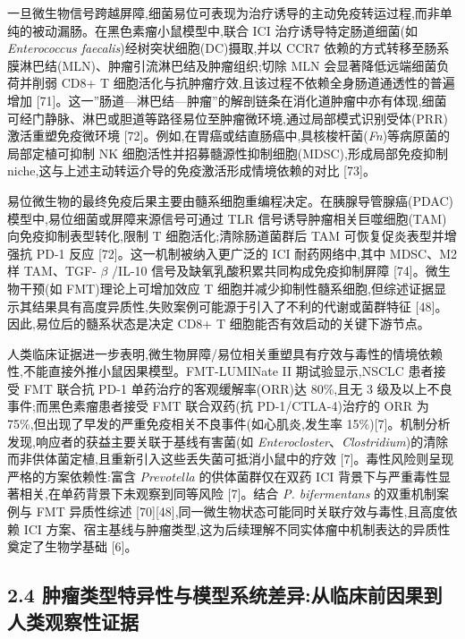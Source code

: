 \documentclass[11pt]{article}
\begin{document}
一旦微生物信号跨越屏障,细菌易位可表现为治疗诱导的主动免疫转运过程,而非单纯的被动漏肠。在黑色素瘤小鼠模型中,联合 ICI 治疗诱导特定肠道细菌(如 \emph{Enterococcus faecalis})经树突状细胞(DC)摄取,并以 CCR7 依赖的方式转移至肠系膜淋巴结(MLN)、肿瘤引流淋巴结及肿瘤组织;切除 MLN 会显著降低远端细菌负荷并削弱 CD8+ T 细胞活化与抗肿瘤疗效,且该过程不依赖全身肠道通透性的普遍增加 {[}71{]}。这一''肠道---淋巴结---肿瘤''的解剖链条在消化道肿瘤中亦有体现,细菌可经门静脉、淋巴或胆道等路径易位至肿瘤微环境,通过局部模式识别受体(PRR)激活重塑免疫微环境 {[}72{]}。例如,在胃癌或结直肠癌中,具核梭杆菌(\emph{Fn})等病原菌的局部定植可抑制 NK 细胞活性并招募髓源性抑制细胞(MDSC),形成局部免疫抑制 niche,这与上述主动转运介导的免疫激活形成情境依赖的对比 {[}73{]}。

易位微生物的最终免疫后果主要由髓系细胞重编程决定。在胰腺导管腺癌(PDAC)模型中,易位细菌或屏障来源信号可通过 TLR 信号诱导肿瘤相关巨噬细胞(TAM)向免疫抑制表型转化,限制 T 细胞活化;清除肠道菌群后 TAM 可恢复促炎表型并增强抗 PD-1 反应 {[}72{]}。这一机制被纳入更广泛的 ICI 耐药网络中,其中 MDSC、M2 样 TAM、TGF- \(\beta\) /IL-10 信号及缺氧乳酸积累共同构成免疫抑制屏障 {[}74{]}。微生物干预(如 FMT)理论上可增加效应 T 细胞并减少抑制性髓系细胞,但综述证据显示其结果具有高度异质性,失败案例可能源于引入了不利的代谢或菌群特征 {[}48{]}。因此,易位后的髓系状态是决定 CD8+ T 细胞能否有效启动的关键下游节点。

人类临床证据进一步表明,微生物屏障/易位相关重塑具有疗效与毒性的情境依赖性,不能直接外推小鼠因果模型。FMT-LUMINate II 期试验显示,NSCLC 患者接受 FMT 联合抗 PD-1 单药治疗的客观缓解率(ORR)达 80\%,且无 3 级及以上不良事件;而黑色素瘤患者接受 FMT 联合双药(抗 PD-1/CTLA-4)治疗的 ORR 为 75\%,但出现了早发的严重免疫相关不良事件(如心肌炎,发生率 15\%){[}7{]}。机制分析发现,响应者的获益主要关联于基线有害菌(如 \emph{Enterocloster}、\emph{Clostridium})的清除而非供体菌定植,且重新引入这些丢失菌可抵消小鼠中的疗效 {[}7{]}。毒性风险则呈现严格的方案依赖性:富含 \emph{Prevotella} 的供体菌群仅在双药 ICI 背景下与严重毒性显著相关,在单药背景下未观察到同等风险 {[}7{]}。结合 \emph{P. bifermentans} 的双重机制案例与 FMT 异质性综述 {[}70{]}{[}48{]},同一微生物状态可能同时关联疗效与毒性,且高度依赖 ICI 方案、宿主基线与肿瘤类型,这为后续理解不同实体瘤中机制表达的异质性奠定了生物学基础 {[}6{]}。

\subsection{2.4 肿瘤类型特异性与模型系统差异:从临床前因果到人类观察性证据}\label{ux80bfux7624ux7c7bux578bux7279ux5f02ux6027ux4e0eux6a21ux578bux7cfbux7edfux5deeux5f02ux4eceux4e34ux5e8aux524dux56e0ux679cux5230ux4ebaux7c7bux89c2ux5bdfux6027ux8bc1ux636e}
\end{document}
